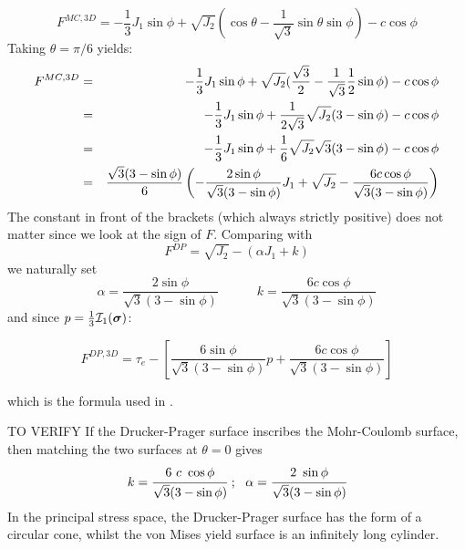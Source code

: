 \[
F^{MC,3D} = -\frac{1}{3}J_1 \sin \phi  + \sqrt{J_2} ( \cos \theta - \frac{1}{\sqrt{3}} \sin \theta  \sin \phi ) - c \cos \phi 
\]
Taking $\theta=\pi/6$ yields:
\begin{eqnarray}
F^{MC,3D} 
&=& -\frac{1}{3}J_1 \sin \phi  + \sqrt{J_2} ( \frac{\sqrt{3}}{2} - \frac{1}{\sqrt{3}} \frac{1}{2}  \sin \phi ) - c \cos \phi  \nonumber\\
&=& -\frac{1}{3}J_1 \sin \phi  + \frac{1}{2\sqrt{3}}\sqrt{J_2} ( 3 -  \sin \phi ) - c \cos \phi  \nonumber\\
&=& -\frac{1}{3}J_1 \sin \phi  + \frac{1}{6}\sqrt{J_2} \sqrt{3}( 3 -  \sin \phi ) - c \cos \phi  \nonumber\\
&=& \frac{\sqrt{3}(3-\sin\phi)}{6} \left( -  \frac{2 \sin \phi}{\sqrt{3}(3-\sin\phi)}   J_1  + \sqrt{J_2}  - \frac{6c \cos \phi}{\sqrt{3}(3-\sin\phi)} \right) \nonumber
\end{eqnarray}
The constant in front of the brackets (which always strictly positive) does not matter since we look at the sign of $F$.
Comparing with 
\[
F^{DP}=\sqrt{J_2} - (\alpha J_1 + k) \label{dpcriterion} 
\]
we naturally set 
\[
\alpha =\frac{2 \sin \phi}{\sqrt{3}(3-\sin\phi)}
\quad\quad\quad  
k =  \frac{6c \cos \phi}{\sqrt{3}(3-\sin\phi)} 
\]
and since $p=\frac{1}{3}{\cal I}_1({\bm \sigma})$:
\begin{mdframed}[backgroundcolor=blue!5]
\[
F^{DP,3D} = \tau_e  - \left[ \frac{6 \sin \phi}{\sqrt{3}(3-\sin\phi)}   p  + 
\frac{6c \cos \phi}{\sqrt{3}(3-\sin\phi)}  \right]
\]
\end{mdframed}
which is the formula used in \cite{gltf18}.





\vspace{1.3cm}
TO VERIFY
If the Drucker-Prager surface inscribes the Mohr-Coulomb surface, then matching the two surfaces at $\theta=0$  gives
\[
k = \cfrac{6~c~\cos\phi}{\sqrt{3}(3-\sin\phi)} ~;~~ \alpha = \cfrac{2~\sin\phi}{\sqrt{3}(3-\sin\phi)} 
\]
In the principal stress space, the Drucker-Prager surface has the form of a circular cone, whilst the von Mises yield surface is an infinitely long cylinder.




